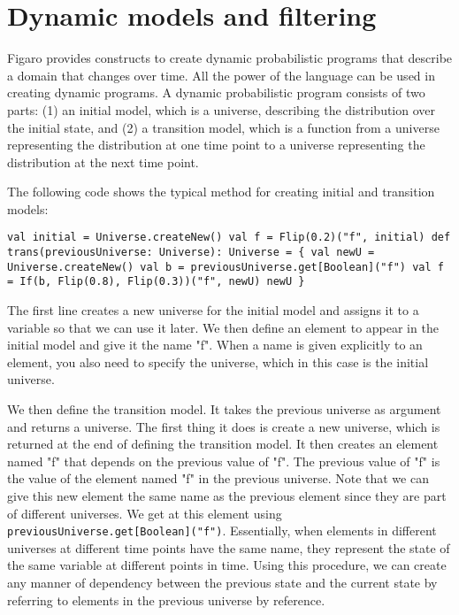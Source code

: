 
\chapter{Dynamic models and filtering} %

\label{Dynamic models and filterings} %

Figaro provides constructs to create dynamic probabilistic programs that describe a domain that changes over time. All the power of the language can be used in creating dynamic programs. A dynamic probabilistic program consists of two parts: (1) an initial model, which is a universe, describing the distribution over the initial state, and (2) a transition model, which is a function from a universe representing the distribution at one time point to a universe representing the distribution at the next time point.

The following code shows the typical method for creating initial and transition models:

\begin{flushleft}
\texttt{val initial = Universe.createNew()
\newline val f = Flip(0.2)("f", initial)
\newline 
\newline def trans(previousUniverse: Universe): Universe = \{
\newline \tab val newU = Universe.createNew()
\newline \tab val b = previousUniverse.get[Boolean]("f")
\newline \tab val f = If(b, Flip(0.8), Flip(0.3))("f", newU)
\newline \tab newU
\newline \}
}
\end{flushleft}

The first line creates a new universe for the initial model and assigns it to a variable so that we can use it later. We then define an element to appear in the initial model and give it the name "f". When a name is given explicitly to an element, you also need to specify the universe, which in this case is the initial universe.

We then define the transition model. It takes the previous universe as argument and returns a universe. The first thing it does is create a new universe, which is returned at the end of defining the transition model. It then creates an element named "f" that depends on the previous value of "f". The previous value of  "f" is the value of the element named "f" in the previous universe. Note that we can give this new element the same name as the previous element since they are part of different universes. We get at this element using \texttt{previousUniverse.get[Boolean]("f")}. Essentially, when elements in different universes at different time points have the same name, they represent the state of the same variable at different points in time. Using this procedure, we can create any manner of dependency between the previous state and the current state by referring to elements in the previous universe by reference.

